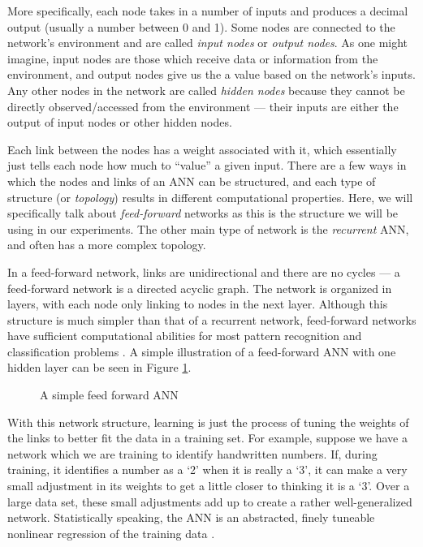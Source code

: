More specifically, each node takes in a number of inputs and produces a decimal output (usually a number between 0 and 1).  Some nodes are connected to the network's environment and are called \textit{input nodes} or \textit{output nodes}.  As one might imagine, input nodes are those which receive data or information from the environment, and output nodes give us the a value based on the network's inputs.  Any other nodes in the network are called \textit{hidden nodes} because they cannot be directly observed/accessed from the environment --- their inputs are either the output of input nodes or other hidden nodes.

Each link between the nodes has a weight associated with it, which essentially just tells each node how much to ``value'' a given input.  There are a few ways in which the nodes and links of an ANN can be structured, and each type of structure (or \textit{topology}) results in different computational properties.  Here, we will specifically talk about \textit{feed-forward} networks as this is the structure we will be using in our experiments.  The other main type of network is the \textit{recurrent} ANN, and often has a more complex topology.

In a feed-forward network, links are unidirectional and there are no cycles --- a feed-forward network is a directed acyclic graph.  The network is organized in layers, with each node only linking to nodes in the next layer.  Although this structure is much simpler than that of a recurrent network, feed-forward networks have sufficient computational abilities for most pattern recognition and classification problems \cite{pruningsource7}.  A simple illustration of a feed-forward ANN with one hidden layer can be seen in Figure \ref{ref:simpleann}.

\begin{figure}[h]
\centering

\caption{A simple feed forward ANN}
\label{ref:simpleann}
\end{figure}

With this network structure, learning is just the process of tuning the weights of the links to better fit the data in a training set.  For example, suppose we have a network which we are training to identify handwritten numbers.  If, during training, it identifies a number as a `2' when it is really a `3', it can make a very small adjustment in its weights to get a little closer to thinking it is a `3'.  Over a large data set, these small adjustments add up to create a rather well-generalized network.  Statistically speaking, the ANN is an abstracted, finely tuneable nonlinear regression of the training data \cite{aimodern}. 

